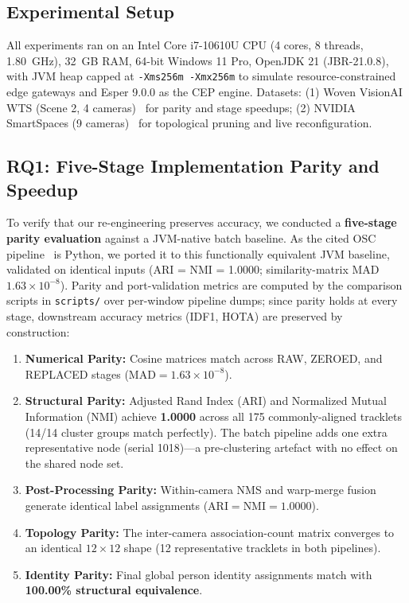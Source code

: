 \documentclass[conference]{IEEEtran}
\begin{document}
\subsection{Experimental Setup}
All experiments ran on an Intel Core i7-10610U CPU (4 cores, 8 threads, 1.80~GHz), 32~GB RAM, 64-bit Windows 11 Pro, OpenJDK 21 (JBR-21.0.8), with JVM heap capped at \texttt{-Xms256m -Xmx256m} to simulate resource-constrained edge gateways and Esper 9.0.0 as the CEP engine. Datasets: (1) Woven VisionAI WTS (Scene 2, 4 cameras)~\cite{kong2024wts} for parity and stage speedups; (2) NVIDIA SmartSpaces (9 cameras)~\cite{aicity2025track1} for topological pruning and live reconfiguration.

\subsection{RQ1: Five-Stage Implementation Parity and Speedup}
To verify that our re-engineering preserves accuracy, we conducted a \textbf{five-stage parity evaluation} against a JVM-native batch baseline. As the cited OSC pipeline~\cite{yoshida2024overlap} is Python, we ported it to this functionally equivalent JVM baseline, validated on identical inputs (ARI = NMI = 1.0000; similarity-matrix MAD $1.63\times10^{-8}$). Parity and port-validation metrics are computed by the comparison scripts in \texttt{scripts/} over per-window pipeline dumps; since parity holds at every stage, downstream accuracy metrics (IDF1, HOTA) are preserved by construction:
\begin{enumerate}
    \item \textbf{Numerical Parity:} Cosine matrices match across RAW, ZEROED, and REPLACED stages ($\text{MAD} = 1.63 \times 10^{-8}$).
    \item \textbf{Structural Parity:} Adjusted Rand Index ($\text{ARI}$) and Normalized Mutual Information ($\text{NMI}$) achieve \textbf{1.0000} across all 175 commonly-aligned tracklets (14/14 cluster groups match perfectly). The batch pipeline adds one extra representative node (serial 1018)---a pre-clustering artefact with no effect on the shared node set.
    \item \textbf{Post-Processing Parity:} Within-camera NMS and warp-merge fusion generate identical label assignments ($\text{ARI} = \text{NMI} = 1.0000$).
    \item \textbf{Topology Parity:} The inter-camera association-count matrix converges to an identical $12\times 12$ shape (12 representative tracklets in both pipelines).
    \item \textbf{Identity Parity:} Final global person identity assignments match with \textbf{100.00\% structural equivalence}.
\end{enumerate}
\end{document}
